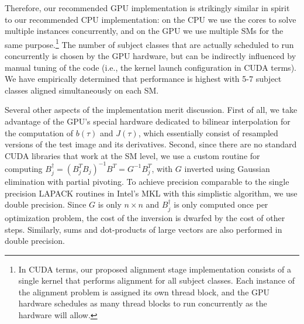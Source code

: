 Therefore, our recommended GPU implementation is strikingly similar in spirit
to our recommended CPU implementation: on the CPU we use the cores to solve
multiple instances concurrently, and on the GPU we use multiple SMs for the 
same purpose.\footnote{In CUDA terms, our proposed alignment stage
implementation consists of a single kernel that performs alignment for all
subject classes.  Each instance of the alignment problem is assigned its own
thread block, and the GPU hardware schedules as many thread blocks to run
concurrently as the hardware will allow.} The number of subject classes that
are actually scheduled to run concurrently is chosen by the GPU hardware, 
but can be indirectly influenced by manual tuning of the code (i.e., the kernel launch
configuration in CUDA terms). We have empirically determined
that performance is highest with 5-7 subject classes aligned simultaneously on each SM.

Several other aspects of the implementation merit discussion.  
First of all, we take advantage of the GPU's special hardware dedicated to bilinear interpolation
for the computation of $b(\tau)$ and $J(\tau)$, which essentially consist of resampled
versions of the test image and its derivatives.
Second, since there are no standard CUDA libraries that work at the SM level, we use a
custom routine for computing $B_j^\dagger = (B_j^TB_j)^{-1} B^T = G^{-1} B_j^T$, with $G$
inverted using Gaussian elimination with partial pivoting.  To achieve
precision comparable to the single precision LAPACK routines in Intel's MKL
with this simplistic algorithm, we use double precision.  Since $G$ is only $n
\times n$ and $B_j^\dagger$ is only computed once per optimization problem, the
cost of the inversion is dwarfed by the cost of other steps.  
Similarly, sums and dot-products of large vectors are also
performed in double precision.

